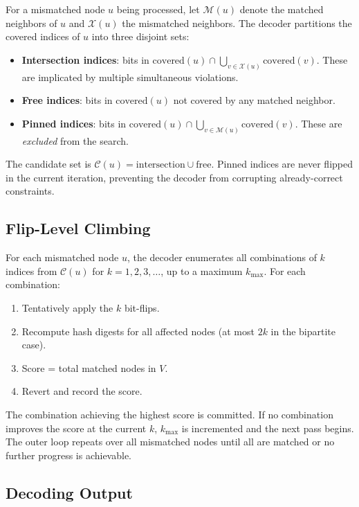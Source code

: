 For a mismatched node $u$ being processed, let $\mathcal{M}(u)$ denote the matched neighbors of $u$ and $\mathcal{X}(u)$ the mismatched neighbors. The decoder partitions the covered indices of $u$ into three disjoint sets:

\begin{itemize}
    \item \textbf{Intersection indices}: bits in $\text{covered}(u) \cap \bigcup_{v \in \mathcal{X}(u)} \text{covered}(v)$. These are implicated by multiple simultaneous violations.
    \item \textbf{Free indices}: bits in $\text{covered}(u)$ not covered by any matched neighbor.
    \item \textbf{Pinned indices}: bits in $\text{covered}(u) \cap \bigcup_{v \in \mathcal{M}(u)} \text{covered}(v)$. These are \emph{excluded} from the search.
\end{itemize}

The candidate set is $\mathcal{C}(u) = \text{intersection} \cup \text{free}$. Pinned indices are never flipped in the current iteration, preventing the decoder from corrupting already-correct constraints.

\subsection{Flip-Level Climbing}

For each mismatched node $u$, the decoder enumerates all combinations of $k$ indices from $\mathcal{C}(u)$ for $k = 1, 2, 3, \ldots$, up to a maximum $k_{\max}$. For each combination:
\begin{enumerate}
    \item Tentatively apply the $k$ bit-flips.
    \item Recompute hash digests for all affected nodes (at most $2k$ in the bipartite case).
    \item Score = total matched nodes in $V$.
    \item Revert and record the score.
\end{enumerate}

The combination achieving the highest score is committed. If no combination improves the score at the current $k$, $k_{\max}$ is incremented and the next pass begins. The outer loop repeats over all mismatched nodes until all are matched or no further progress is achievable.

\subsection{Decoding Output}


